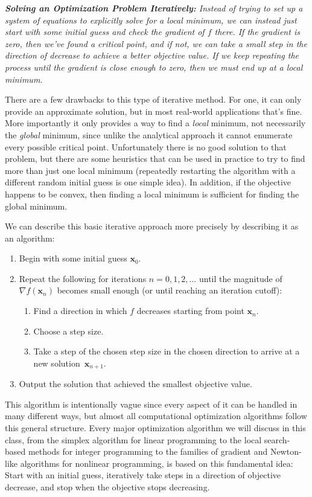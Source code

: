 \documentclass[11pt]{article}
\theoremstyle{definition} %
\begin{document}
\textit{\textbf{Solving an Optimization Problem Iteratively:} Instead of trying to set up a system of equations to explicitly solve for a local minimum, we can instead just start with some initial guess and check the gradient of $f$ there. If the gradient is zero, then we've found a critical point, and if not, we can take a small step in the direction of decrease to achieve a better objective value. If we keep repeating the process until the gradient is close enough to zero, then we must end up at a local minimum.}

There are a few drawbacks to this type of iterative method. For one, it can only provide an approximate solution, but in most real-world applications that's fine. More importantly it only provides a way to find a \textit{local} minimum, not necessarily the \textit{global} minimum, since unlike the analytical approach it cannot enumerate every possible critical point. Unfortunately there is no good solution to that problem, but there are some heuristics that can be used in practice to try to find more than just one local minimum (repeatedly restarting the algorithm with a different random initial guess is one simple idea). In addition, if the objective happens to be convex, then finding a local minimum is sufficient for finding the global minimum.

We can describe this basic iterative approach more precisely by describing it as an algorithm:
\begin{enumerate}
	\item Begin with some initial guess $\mathbf{x}_0$.
	\item Repeat the following for iterations $n=0,1,2,\dots$ until the magnitude of $\nabla f(\mathbf{x}_n)$ becomes small enough (or until reaching an iteration cutoff):
	\begin{enumerate}
		\item Find a direction in which $f$ decreases starting from point $\mathbf{x}_n$.
		\item Choose a step size.
		\item Take a step of the chosen step size in the chosen direction to arrive at a new solution~$\mathbf{x}_{n+1}$.
	\end{enumerate}
	\item Output the solution that achieved the smallest objective value.
\end{enumerate}

This algorithm is intentionally vague since every aspect of it can be handled in many different ways, but almost all computational optimization algorithms follow this general structure. Every major optimization algorithm we will discuss in this class, from the simplex algorithm for linear programming to the local search-based methods for integer programming to the families of gradient and Newton-like algorithms for nonlinear programming, is based on this fundamental idea: Start with an initial guess, iteratively take steps in a direction of objective decrease, and stop when the objective stops decreasing.
\end{document}
